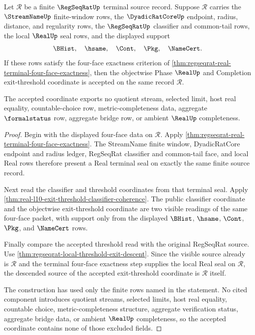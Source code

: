 \begin{theorem}
\label{thm:regseqrat-local-threshold-four-face-sufficiency}
Let $\mathcal R$ be a finite $\RegSeqRatUp$ terminal source record. Suppose $\mathcal R$ carries the $\StreamNameUp$ finite-window rows, the $\DyadicRatCoreUp$ endpoint, radius, distance, and regularity rows, the $\RegSeqRatUp$ classifier and common-tail rows, the local $\RealUp$ seal rows, and the displayed support
$$
\BHist,\quad \hsame,\quad \Cont,\quad \Pkg,\quad \NameCert.
$$
If these rows satisfy the four-face exactness criterion of \autoref{thm:regseqrat-real-terminal-four-face-exactness}, then the objectwise Phase $\RealUp$ and Completion exit-threshold coordinate is accepted on the same record $\mathcal R$.

The accepted coordinate exports no quotient stream, selected limit, host real equality, countable-choice row, metric-completeness data, aggregate $\formalstatus$ row, aggregate bridge row, or ambient $\RealUp$ completeness.
\end{theorem}
\begin{proof}
Begin with the displayed four-face data on $\mathcal R$. Apply \autoref{thm:regseqrat-real-terminal-four-face-exactness}. The StreamName finite window, DyadicRatCore endpoint and radius ledger, RegSeqRat classifier and common-tail face, and local Real rows therefore present a Real terminal seal on exactly the same finite source record.

Next read the classifier and threshold coordinates from that terminal seal. Apply \autoref{thm:real-l10-exit-threshold-classifier-coherence}. The public classifier coordinate and the objectwise exit-threshold coordinate are two visible readings of the same four-face packet, with support only from the displayed $\BHist$, $\hsame$, $\Cont$, $\Pkg$, and $\NameCert$ rows.

Finally compare the accepted threshold read with the original RegSeqRat source. Use \autoref{thm:regseqrat-local-threshold-exit-descent}. Since the visible source already is $\mathcal R$ and the terminal four-face exactness step supplies the local Real seal on $\mathcal R$, the descended source of the accepted exit-threshold coordinate is $\mathcal R$ itself.

The construction has used only the finite rows named in the statement. No cited component introduces quotient streams, selected limits, host real equality, countable choice, metric-completeness structure, aggregate verification status, aggregate bridge data, or ambient $\RealUp$ completeness, so the accepted coordinate contains none of those excluded fields.
\end{proof}

